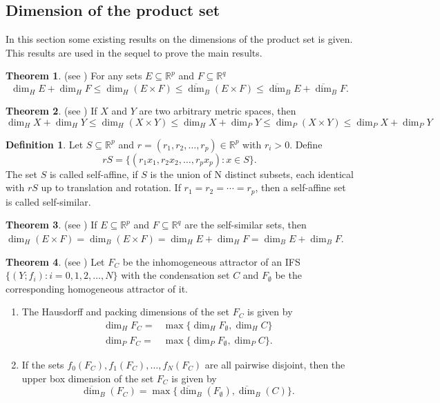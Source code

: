 \documentclass[10pt]{amsart}
\theoremstyle{definition}
\newtheorem{dfn}{Definition}[section]
\newtheorem{thm}{Theorem}[section]
\begin{document}
	\subsection{Dimension of the product set}\label{exrofdofps}
	In this section  some existing results on the dimensions of the product set is given. This results are used in the sequel to  prove the main results.
	\begin{thm} (see \cite{FG})
		For any sets $E\subseteq \mathbb{R}^p$ and $F\subseteq\mathbb{R}^q$
		$$\dim_HE+\dim_HF\leq\dim_H(E\times F)\leq\overline{\dim}_B(E\times F)\leq\overline{\dim}_BE+\overline{\dim}_BF.$$
		\label{rotpset}
	\end{thm}
	\begin{thm} (see \cite{PD})
		If $X$ and $Y$ are two arbitrary metric spaces, then $$\dim_HX+\dim_HY\leq\dim_H(X\times Y)\leq\dim_HX+\dim_PY\leq\dim_P(X\times Y)\leq\dim_PX+\dim_PY$$
		\label{rbarptset}
	\end{thm}
	\begin{dfn}
		Let $S\subseteq \mathbb{R}^p$ and $r=(r_1,r_2,\ldots,r_p)\in \mathbb{R}^p$ with $r_i>0$. Define $$rS=\{(r_1x_1,r_2x_2,\ldots,r_px_p):x\in S\}.$$ The set $S$ is called
		self-affine, if $S$ is the union of N distinct subsets, each identical with $rS$ up to translation and rotation. If $r_1 = r_2 =\cdots= r_p$,
		then a self-affine set is called self-similar.
		\label{dfssset}
	\end{dfn}
	\begin{thm} (see \cite{FDIPS})
		If $E\subseteq \mathbb{R}^p$ and $F\subseteq\mathbb{R}^q$ are the self-similar sets, then $\dim_H(E\times F)=\dim_B(E\times F)=\dim_HE+\dim_HF=\dim_BE+\dim_BF.$
		\label{sslm}
	\end{thm}
	\begin{thm}(see \cite{Inssm,Ihomossbd})
		\label{doinhomoprsets}
		Let $F_C$  be the  inhomogeneous attractor of an IFS $\{(Y;f_i):i=0,1,2,\ldots,N\}$ with the condensation set $C$ and $F_{\emptyset}$ be the corresponding homogeneous attractor of it.
		\begin{enumerate}
			\item The Hausdorff and packing dimensions of the set $F_C$ is given by
			\begin{align*}
				\dim_HF_C=&\max\{\dim_HF_{\emptyset},\dim_HC\}\\
				\dim_PF_C=&\max\{\dim_PF_{\emptyset},\dim_PC\}.
			\end{align*}
			\item If the sets $f_0(F_C),f_1(F_C),\ldots,f_N(F_C)$ are all pairwise disjoint, then the upper box dimension of the set $F_C$ is  given by
			$$\overline{\dim}_B(F_C)=\max\{\overline{\dim}_B(F_{\emptyset}),\overline{\dim}_B(C)\}.$$
		\end{enumerate}
	\end{thm}
	
\end{document}
